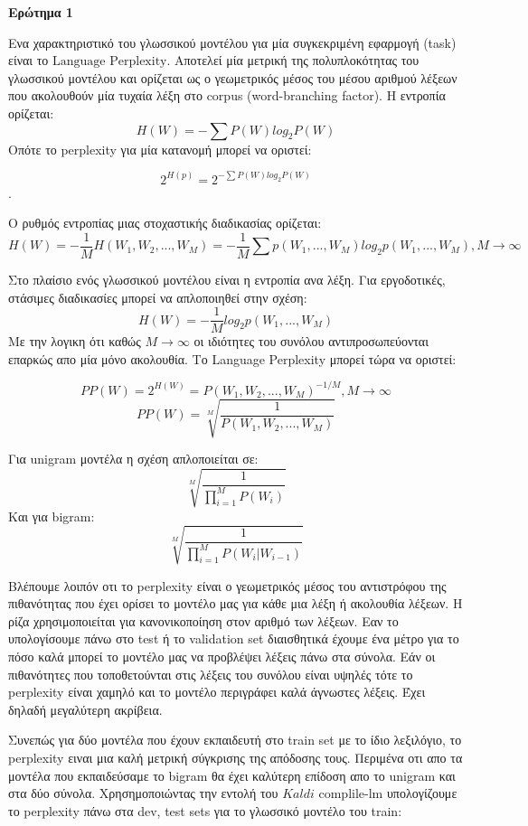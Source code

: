 \documentclass[12pt]{article}
\begin{document}
\textbf{Ερώτημα 1}

Ενα χαρακτηριστικό του γλωσσικού μοντέλου για μία συγκεκριμένη εφαρμογή (task) είναι το $\text{Language Perplexity}$. Αποτελεί μία μετρική της πολυπλοκότητας του γλωσσικού μοντέλου και ορίζεται ως ο γεωμετρικός μέσος του μέσου αριθμού λέξεων που ακολουθούν μία τυχαία λέξη στο corpus (word-branching factor). Η εντροπία ορίζεται: 
$$ H(W) = -\sum P(W) log_2P(W)$$
Οπότε το perplexity για μία κατανομή μπορεί να οριστεί:

$$2^{H(p)} = 2^{-\sum P(W) log_2P(W)} $$.

Ο ρυθμός εντροπίας μιας στοχαστικής διαδικασίας ορίζεται: 
$$H(W) = -\frac{1}{M} H(W_1,W_2,...,W_M) = -\frac{1}{M} \sum p(W_1,...,W_M) log_2 p(W_1,...,W_M) , M \to \infty$$

Στο πλαίσιο ενός γλωσσικού μοντέλου είναι η εντροπία ανα λέξη. 
Για εργοδοτικές, στάσιμες διαδικασίες μπορεί να απλοποιηθεί στην σχέση:
$$H(W) = -\frac{1}{M} log_2 p(W_1,...,W_M) $$
Με την λογικη ότι καθώς $M \to \infty$ οι ιδιότητες του συνόλου αντιπροσωπεύονται επαρκώς απο μία μόνο ακολουθία. 
Το Language Perplexity μπορεί τώρα να οριστεί:

$$PP(W) = 2^{H(W)} = P(W_1,W_2,...,W_M)^{-1/M} , M \to \infty $$
$$PP(W) = \sqrt[M]{\frac{1}{P(W_1,W_2,...,W_M)}}$$

Για unigram μοντέλα η σχέση απλοποιείται σε: 
$$\sqrt[M]{\frac{1}{\prod_{i=1}^MP(W_i)}}$$
Και για bigram:
$$\sqrt[M]{\frac{1}{\prod_{i=1}^MP(W_i|W_{i-1})}}$$


Βλέπουμε λοιπόν οτι το perplexity είναι ο γεωμετρικός μέσος του αντιστρόφου της πιθανότητας που έχει ορίσει το μοντέλο μας για κάθε μια λέξη ή ακολουθία λέξεων. Η ρίζα χρησιμοποιείται για κανονικοποίηση στον αριθμό των λέξεων. Εαν το υπολογίσουμε πάνω στο test ή το validation set διαισθητικά έχουμε ένα μέτρο για το πόσο καλά μπορεί το μοντέλο μας να προβλέψει λέξεις πάνω στα σύνολα. Εάν οι πιθανότητες που τοποθετούνται στις λέξεις του συνόλου είναι υψηλές τότε το perplexity είναι χαμηλό και το μοντέλο περιγράφει καλά άγνωστες λέξεις.  Έχει δηλαδή μεγαλύτερη ακρίβεια. 

Συνεπώς για δύο μοντέλα που έχουν εκπαιδευτή στο train set με το ίδιο λεξιλόγιο, το perplexity ειναι μια καλή μετρική σύγκρισης της απόδοσης τους. Περιμένα οτι απο τα μοντέλα που εκπαιδεύσαμε το bigram θα έχει καλύτερη επίδοση απο το unigram και στα δύο σύνολα. Χρησημοποιώντας την εντολή του $Kaldi$ complile-lm υπολογίζουμε το perplexity πάνω στα dev, test sets για το γλωσσικό μοντέλο του train: 
\end{document}
